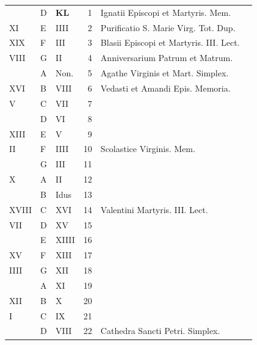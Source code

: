 \begin{center}
\begin{tabular}{l | l | l | r | l l}
 & D & \textbf{\color{Red} K\color{Blue}L} & 1 & \color{Red} Ignatii Episcopi et Martyris. Mem. \\

\color{Red} XI & E & \color{Red} IIII & 2 & \multicolumn{2}{l}{Purificatio S. Marie Virg. Tot. Dup.} \\
\color{Red} XIX & F & \color{Red} III & 3 & \color{Red} Blasii Episcopi et Martyris. III. Lect. \\
\color{Red} VIII & G & \color{Red} II & 4 & Anniversarium Patrum et Matrum. \\
 & \color{Red} A & \color{Red} Non. & 5 & \color{Red} Agathe Virginis et Mart. Simplex. \\
\color{Red} XVI & B & \color{Red} VIII & 6 &  Vedasti et Amandi Epis. Memoria. \\
\color{Red} V & C & \color{Red} VII & 7 & \\
\color{Red}  & D & \color{Red} VI & 8 & \\
\color{Red} XIII & E & \color{Red} V & 9 & & \color{Red} \\
\color{Red} II & F & \color{Red} IIII & 10 & Scolastice Virginis. Mem. & \color{Red} \\
\color{Red}  & G & \color{Red} III & 11 & & \color{Red} \\
\color{Red} X & \color{Red} A & \color{Red} II & 12 & \\
\color{Red}  & B & \color{Red} Idus & 13 & & \color{Red} \\
\color{Red} XVIII & C & \color{Red} XVI & 14 & \color{Red} Valentini Martyris. III. Lect. \\
\color{Red} VII & D & \color{Red} XV & 15 & \\
\color{Red}  & E & \color{Red} XIIII & 16 & & \color{Red} \\
\color{Red} XV & F & \color{Red} XIII & 17 & & \color{Red} \\
\color{Red} IIII & G & \color{Red} XII & 18 & & \color{Red} \\
\color{Red}  & \color{Red} A & \color{Red} XI & 19 & & \color{Red} \\
\color{Red} XII & B & \color{Red} X & 20 & & \color{Red} \\
\color{Red} I & C & \color{Red} IX & 21 & & \color{Red} \\
\color{Red}  & D & \color{Red} VIII & 22 & \color{Red} Cathedra Sancti Petri. Simplex. \\

\end{tabular}
\end{center}
